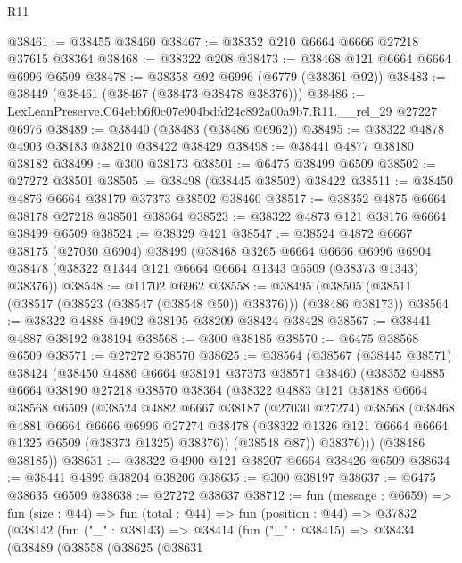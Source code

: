\begin{lexlean}{R11}
\begin{coremodule}
@38461 := @38455 @38460
@38467 := @38352 @210 @6664 @6666 @27218 @37615 @38364
@38468 := @38322 @208
@38473 := @38468 @121 @6664 @6664 @6996 @6509
@38478 := @38358 @92 @6996 (@6779 (@38361 @92))
@38483 := @38449 (@38461 (@38467 (@38473 @38478 @38376)))
@38486 := LexLeanPreserve.C64ebb6f0c07e904bdfd24c892a00a9b7.R11.__rel_29 @27227 @6976
@38489 := @38440 (@38483 (@38486 @6962))
@38495 := @38322 @4878 @4903 @38183 @38210 @38422 @38429
@38498 := @38441 @4877 @38180 @38182
@38499 := @300 @38173
@38501 := @6475 @38499 @6509
@38502 := @27272 @38501
@38505 := @38498 (@38445 @38502) @38422
@38511 := @38450 @4876 @6664 @38179 @37373 @38502 @38460
@38517 := @38352 @4875 @6664 @38178 @27218 @38501 @38364
@38523 := @38322 @4873 @121 @38176 @6664 @38499 @6509
@38524 := @38329 @421
@38547 := @38524
    @4872
    @6667
    @38175
    (@27030 @6904)
    @38499
    (@38468
      @3265
      @6664
      @6666
      @6996
      @6904
      @38478
      (@38322 @1344 @121 @6664 @6664 @1343 @6509 (@38373 @1343) @38376))
@38548 := @11702 @6962
@38558 := @38495 (@38505 (@38511 (@38517 (@38523 (@38547 (@38548 @50)) @38376))) (@38486 @38173))
@38564 := @38322 @4888 @4902 @38195 @38209 @38424 @38428
@38567 := @38441 @4887 @38192 @38194
@38568 := @300 @38185
@38570 := @6475 @38568 @6509
@38571 := @27272 @38570
@38625 := @38564
    (@38567
      (@38445 @38571)
      @38424
      (@38450
        @4886
        @6664
        @38191
        @37373
        @38571
        @38460
        (@38352
          @4885
          @6664
          @38190
          @27218
          @38570
          @38364
          (@38322
            @4883
            @121
            @38188
            @6664
            @38568
            @6509
            (@38524
              @4882
              @6667
              @38187
              (@27030 @27274)
              @38568
              (@38468
                @4881
                @6664
                @6666
                @6996
                @27274
                @38478
                (@38322 @1326 @121 @6664 @6664 @1325 @6509 (@38373 @1325) @38376))
              (@38548 @87))
            @38376)))
      (@38486 @38185))
@38631 := @38322 @4900 @121 @38207 @6664 @38426 @6509
@38634 := @38441 @4899 @38204 @38206
@38635 := @300 @38197
@38637 := @6475 @38635 @6509
@38638 := @27272 @38637
@38712 := fun (message : @6659) =>
  fun (size : @44) =>
  fun (total : @44) =>
  fun (position : @44) =>
  @37832
    (@38142
      (fun ("_" : @38143) =>
      @38414
        (fun ("_" : @38415) =>
        @38434
          (@38489
            (@38558
              (@38625
                (@38631

\end{coremodule}
\end{lexlean}
